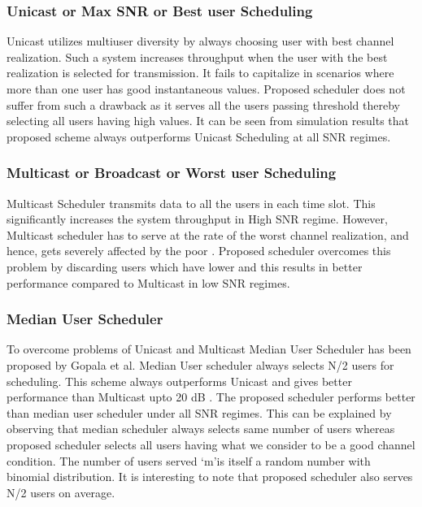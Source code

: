 \documentclass[conference]{IEEEtran}
\begin{document}
\subsubsection{Unicast or Max SNR or Best user Scheduling} 


Unicast utilizes multiuser diversity by always choosing user with best channel realization. Such a system increases throughput when the user  with the best realization is selected for transmission. It fails to capitalize in scenarios where more than one user has good instantaneous values. Proposed scheduler does not suffer from such a drawback as it serves all the users passing threshold thereby selecting all users having high   values. It can be seen from simulation results that proposed scheme always outperforms Unicast Scheduling at all SNR regimes.

\subsubsection{Multicast  or Broadcast or Worst user Scheduling}

Multicast Scheduler transmits data to all the users in each time slot. This significantly increases the system throughput in High SNR regime. However, Multicast scheduler has to serve at the rate of the worst channel realization, and hence, gets severely affected by the poor  . Proposed scheduler overcomes this problem by discarding users which have lower and this results in better performance compared to Multicast in low SNR regimes.

\subsubsection{Median User Scheduler}


  To overcome problems of Unicast and Multicast Median User Scheduler has been proposed by Gopala et al. \cite{Praveenkumar_throuputdelay,Praveen_Kumar}
Median User scheduler always selects N/2 users for scheduling. This scheme always outperforms Unicast and gives better performance than Multicast upto 20 dB . The proposed scheduler performs better than median user scheduler under all SNR regimes. This can be explained by observing that median scheduler always selects same number of users whereas proposed scheduler selects all users having what we consider to be a good channel condition. The number of users served \textquoteleft m\textquoteright  is itself a random number with binomial distribution. It is interesting to note that proposed scheduler also serves N/2 users on average.
\end{document}
